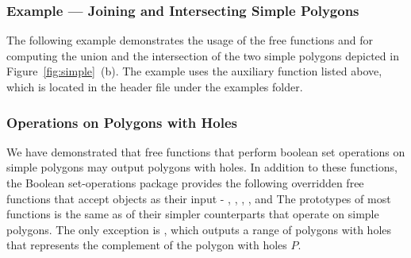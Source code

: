 \subsubsection{Example --- Joining and Intersecting Simple Polygons\label{bso_sssec:ex_simple_bops}}

The following example demonstrates the usage of the free functions
 and  for computing the union and the
intersection of the two simple polygons depicted in
Figure~\ref{fig:simple}~(b). The example uses the auxiliary function
 listed above, which is located in
the header file  under the examples folder.


\subsubsection{Operations on Polygons with Holes\label{bso_sssec:pwh_bops}}
We have demonstrated that free functions that perform boolean set operations on simple polygons may output polygons with holes. In addition to these functions, the Boolean set-operations package provides the following overridden free functions that accept
 objects as their input - 
, , , ,
 and   The prototypes of
most functions is the same as of their simpler counterparts that operate
on simple polygons. The only exception is , which
outputs a range of polygons with holes that represents the complement
of the polygon with holes $P$.

